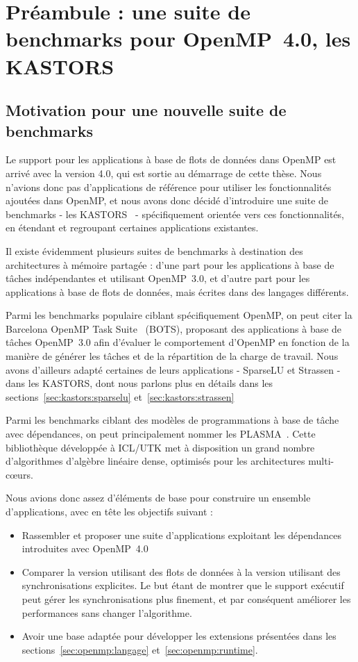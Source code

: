 \section{Préambule : une suite de benchmarks pour OpenMP~4.0, les KASTORS}

\subsection{Motivation pour une nouvelle suite de benchmarks}

Le support pour les applications à base de flots de données dans OpenMP est arrivé avec la version 4.0, qui est sortie au démarrage de cette thèse.
Nous n'avions donc pas d'applications de référence pour utiliser les fonctionnalités ajoutées dans OpenMP, et nous avons donc décidé d'introduire une suite de benchmarks - les KASTORS~\cite{Virouleau2014} - spécifiquement orientée vers ces fonctionnalités, en étendant et regroupant certaines applications existantes.

Il existe évidemment plusieurs suites de benchmarks à destination des architectures à mémoire partagée : d'une part pour les applications à base de tâches indépendantes et utilisant OpenMP~3.0, et d'autre part pour les applications à base de flots de données, mais écrites dans des langages différents.

Parmi les benchmarks populaire ciblant spécifiquement OpenMP, on peut citer la Barcelona OpenMP Task Suite~\cite{Duran2009} (BOTS), proposant des applications à base de tâches OpenMP~3.0 afin d'évaluer le comportement d'OpenMP en fonction de la manière de générer les tâches et de la répartition de la charge de travail.
Nous avons d'ailleurs adapté certaines de leurs applications - SparseLU et Strassen - dans les KASTORS, dont nous parlons plus en détails dans les sections~\ref{sec:kastors:sparselu} et~\ref{sec:kastors:strassen}

Parmi les benchmarks ciblant des modèles de programmations à base de tâche avec dépendances, on peut principalement nommer les PLASMA~\cite{Kurzak2013}.
Cette bibliothèque développée à ICL/UTK met à disposition un grand nombre d'algorithmes d'algèbre linéaire dense, optimisés pour les architectures multi-cœurs.

Nous avions donc assez d'éléments de base pour construire un ensemble d'applications, avec en tête les objectifs suivant :
\begin{itemize}
  \item Rassembler et proposer une suite d'applications exploitant les dépendances introduites avec OpenMP~4.0
  \item Comparer la version utilisant des flots de données à la version utilisant des synchronisations explicites. Le but étant de montrer que le support exécutif peut gérer les synchronisations plus finement, et par conséquent améliorer les performances sans changer l'algorithme.
  \item Avoir une base adaptée pour développer les extensions présentées dans les sections~\ref{sec:openmp:langage} et~\ref{sec:openmp:runtime}.
\end{itemize}

